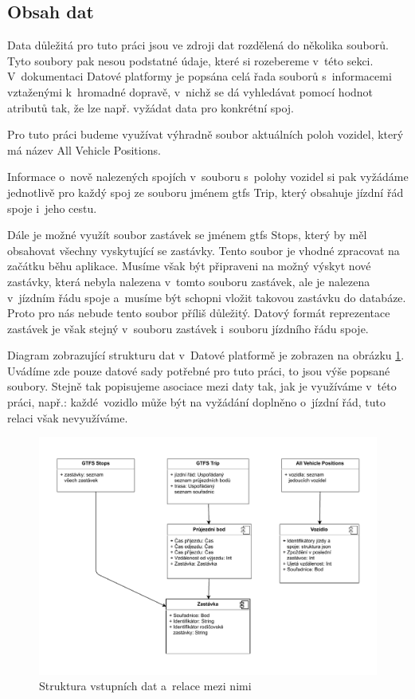 \subsection{Obsah dat}

Data důležitá pro tuto práci jsou ve zdroji dat rozdělená do několika souborů. Tyto soubory pak nesou podstatné údaje, které si rozebereme v~této sekci. V~dokumentaci Datové platformy je popsána celá řada souborů s~informacemi vztaženými k~hromadné dopravě, v~nichž se dá vyhledávat pomocí hodnot atributů tak, že lze např. vyžádat data pro konkrétní spoj.

\bigbreak

Pro tuto práci budeme využívat výhradně soubor aktuálních poloh vozidel, který má název All Vehicle Positions.

\bigbreak

Informace o~nově nalezených spojích v~souboru s~polohy vozidel si pak vyžádáme jednotlivě pro každý spoj ze souboru jménem \gls{gtfs} Trip, který obsahuje jízdní řád spoje i~jeho cestu.

\bigbreak

Dále je možné využít soubor zastávek se jménem \gls{gtfs} Stops, který by měl obsahovat všechny vyskytující se zastávky. Tento soubor je vhodné zpracovat na začátku běhu aplikace. Musíme však být připraveni na možný výskyt nové zastávky, která nebyla nalezena v~tomto souboru zastávek, ale je nalezena v~jízdním řádu spoje a~musíme být schopni vložit takovou zastávku do databáze. Proto pro nás nebude tento soubor příliš důležitý. Datový formát reprezentace zastávek je však stejný v~souboru zastávek i~souboru jízdního řádu spoje.

\bigbreak

Diagram zobrazující strukturu dat v~Datové platformě je zobrazen na obrázku \ref{fig:relace_vstupnich_dat}. Uvádíme zde pouze datové sady potřebné pro tuto práci, to jsou výše popsané soubory. Stejně tak popisujeme asociace mezi daty tak, jak je využíváme v~této práci, např.: každé vozidlo může být na vyžádání doplněno o~jízdní řád, tuto relaci však nevyužíváme.

\begin{figure}
	\centering
  \includegraphics[width=\linewidth]{../img/relace_vstupnich_dat}
  \caption{Struktura vstupních dat a~relace mezi nimi}
  \label{fig:relace_vstupnich_dat}
\end{figure}


